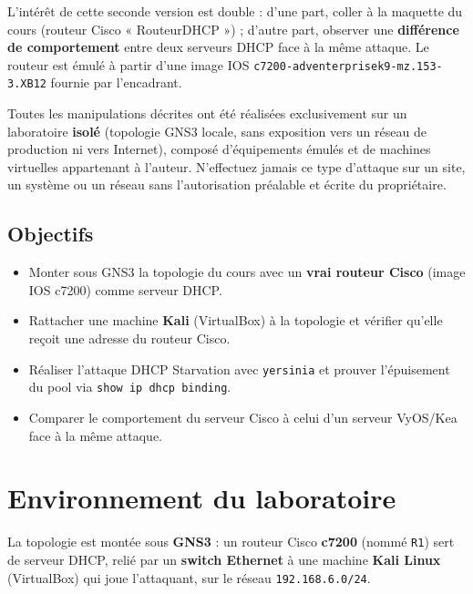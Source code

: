 \documentclass[11pt,a4paper]{article}
\begin{document}
L'intérêt de cette seconde version est double : d'une part, coller à la maquette du cours
(routeur Cisco « RouteurDHCP ») ; d'autre part, observer une \textbf{différence de comportement}
entre deux serveurs DHCP face à la même attaque. Le routeur est émulé à partir d'une image IOS
\texttt{c7200-adventerprisek9-mz.153-3.XB12} fournie par l'encadrant.

\begin{avertissement}
Toutes les manipulations décrites ont été réalisées exclusivement sur un laboratoire
\textbf{isolé} (topologie GNS3 locale, sans exposition vers un réseau de production ni vers
Internet), composé d'équipements émulés et de machines virtuelles appartenant à l'auteur.
N'effectuez jamais ce type d'attaque sur un site, un système ou un réseau sans l'autorisation
préalable et écrite du propriétaire.
\end{avertissement}

\subsection{Objectifs}
\begin{itemize}[leftmargin=1.4em]
  \item Monter sous GNS3 la topologie du cours avec un \textbf{vrai routeur Cisco} (image IOS
        c7200) comme serveur DHCP.
  \item Rattacher une machine \textbf{Kali} (VirtualBox) à la topologie et vérifier qu'elle
        reçoit une adresse du routeur Cisco.
  \item Réaliser l'attaque DHCP Starvation avec \texttt{yersinia} et prouver l'épuisement du
        pool via \texttt{show ip dhcp binding}.
  \item Comparer le comportement du serveur Cisco à celui d'un serveur VyOS/Kea face à la même
        attaque.
\end{itemize}

\section{Environnement du laboratoire}
La topologie est montée sous \textbf{GNS3} : un routeur Cisco \textbf{c7200} (nommé \texttt{R1})
sert de serveur DHCP, relié par un \textbf{switch Ethernet} à une machine \textbf{Kali Linux}
(VirtualBox) qui joue l'attaquant, sur le réseau \texttt{192.168.6.0/24}.
\end{document}
